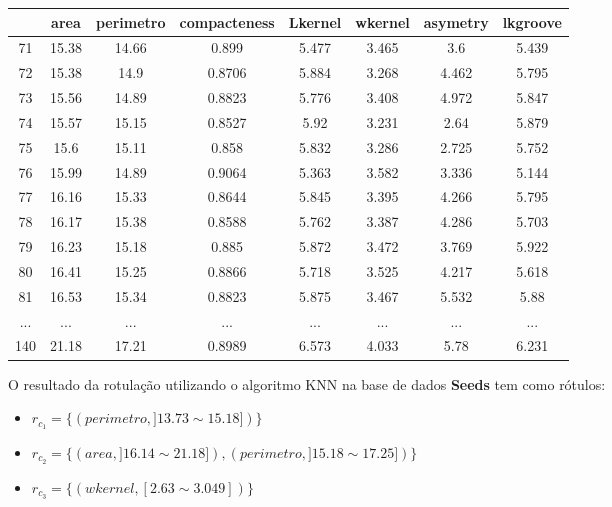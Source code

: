 \begin{table}[!h]
{\begin{tabular}{|c|c|c|c|c|c|c|c|}
& area & perimetro & compacteness & Lkernel & wkernel & asymetry &lkgroove \\ \hline
\rowcolor[HTML]{EFEFEF} 
71 & 15.38 & 14.66 & 0.899 & 5.477 & 3.465 & 3.6 & 5.439\\ \hline 
\rowcolor[HTML]{EFEFEF}
72 & 15.38 & 14.9 & 0.8706 & 5.884 & 3.268 & 4.462 & 5.795\\ \hline 
\rowcolor[HTML]{EFEFEF}
73 & 15.56 & 14.89 & 0.8823 & 5.776 & 3.408 & 4.972 & 5.847\\ \hline 
\rowcolor[HTML]{EFEFEF}
74 & 15.57 & 15.15 & 0.8527 & 5.92 & 3.231 & 2.64 & 5.879\\ \hline 
\rowcolor[HTML]{EFEFEF}
75 & 15.6 & 15.11 & 0.858 & 5.832 & 3.286 & 2.725 & 5.752\\ \hline 
\rowcolor[HTML]{EFEFEF}
76 & 15.99 & 14.89 & 0.9064 & 5.363 & 3.582 & 3.336 & 5.144\\ \hline 
77 & 16.16 & 15.33 & 0.8644 & 5.845 & 3.395 & 4.266 & 5.795\\ \hline 
78 & 16.17 & 15.38 & 0.8588 & 5.762 & 3.387 & 4.286 & 5.703\\ \hline 
\rowcolor[HTML]{EFEFEF}
79 & 16.23 & 15.18 & 0.885 & 5.872 & 3.472 & 3.769 & 5.922\\ \hline 
80 & 16.41 & 15.25 & 0.8866 & 5.718 & 3.525 & 4.217 & 5.618\\ \hline 
81 & 16.53 & 15.34 & 0.8823 & 5.875 & 3.467 & 5.532 & 5.88\\ \hline 
...& ... & ... & ... & ... & ... & ... & ...\\ \hline 
140 & 21.18 & 17.21 & 0.8989 & 6.573 & 4.033 & 5.78 & 6.231\\ \hline 

\end{tabular}
    }
    
 \label{tab:analise:seeds}
\end{table}

O resultado da rotulação utilizando o algoritmo KNN na base de dados \textbf{Seeds} tem como rótulos: 
\begin{itemize}[noitemsep]
 \item ${r_{c_1}=\{ (perimetro, ]13.73 \sim 15.18]) \} }$
 \item ${r_{c_2}=\{ (area, ]16.14 \sim 21.18]), (perimetro, ]15.18 \sim 17.25]) \} }$
 \item ${r_{c_3}=\{ (wkernel, [2.63 \sim 3.049]) \} }$
\end{itemize}

